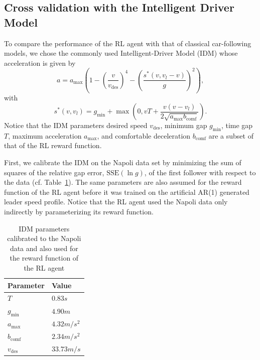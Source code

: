 \documentclass[review]{elsarticle}
\providecommand{\sub}[1]{_{\mathrm{#1}}}  %
\providecommand{\3}{{\ss}}
\begin{document}
\subsection{Cross validation with the Intelligent Driver Model}
\label{sec:crossValIDM}
To compare the performance of the RL agent with that of
classical car-following models, we chose the commonly used
Intelligent-Driver Model (IDM)\cite{Opus} whose acceleration is given
by 
\begin{equation}
\label{eq:IDM}
a=a\sub{max}\left(1-\left(\frac{v}{v\sub{des}}\right)^{4}-\left(\frac{s^{*}\left(v, v_l-v\right)}{g}\right)^{2}\right),
\end{equation}
with
\begin{equation}
\label{eq:IDMsstar}
s^{*}\left(v, v_l\right)=g\sub{min}+\max \left(0,vT+\frac{v(v-v_l)}{2 \sqrt{a\sub{max} b\sub{comf}}}\right).
\end{equation}
Notice that the IDM parameters desired
speed $v\sub{des}$, minimum gap $g\sub{min}$, time gap $T$, maximum
acceleration $a\sub{max}$, and
comfortable deceleration $b\sub{comf}$ are a subset of that of the RL reward
function. 

First, we calibrate the IDM on the Napoli data set by
minimizing the sum of squares of the relative gap error,
$\mathrm{SSE}(\ln g)$, of the first follower with respect to the
data (cf. Table~\ref{tab:IDMparameters}). The same parameters are also
assumed for the reward function of the RL agent before it was trained
on the artificial AR(1) generated leader speed profile. Notice that the RL agent used the Napoli data only
indirectly by parameterizing its reward function.

\begin{table}
	\caption{IDM parameters calibrated to the Napoli
            data and also used for the reward function of the RL agent}
	\label{tab:IDMparameters} 
	\begin{center}
		\begin{tabular}{ p{} |p{}  } 
		Parameter & Value   \\ \hline
			$T$ & $0.83s$\\
			$g\sub{min}$ & $4.90m$\\
			$a\sub{max}$ & $4.32m/s^2$\\
			$b\sub{comf}$ & $2.34 m/s^2$\\
			$v\sub{des}$ & $33.73m/s$
			
		\end{tabular}
	\end{center}
\end{table}
\end{document}
